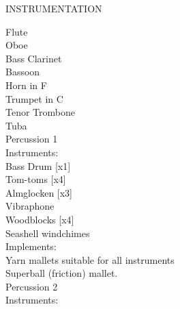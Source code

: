 \documentclass[11pt]{article}
\begin{document}
\endgroup

\vspace*{8\baselineskip}

\begin{center}
\huge INSTRUMENTATION
\end{center}

\hspace*{1cm} Flute
\\
\hspace*{1cm} Oboe
\\
\hspace*{1cm} Bass Clarinet
\\
\hspace*{1cm} Bassoon
\\
\hspace*{1cm} Horn in F
\\
\hspace*{1cm} Trumpet in C
\\
\hspace*{1cm} Tenor Trombone
\\
\hspace*{1cm} Tuba
\\
\hspace*{1cm} Percussion 1
\\
\hspace*{2cm} Instruments:
\\
\hspace*{3cm} Bass Drum [x1]
\\
\hspace*{3cm} Tom-toms [x4]
\\
\hspace*{3cm} Almglocken [x3]
\\
\hspace*{3cm} Vibraphone
\\
\hspace*{3cm} Woodblocks [x4]
\\
\hspace*{3cm} Seashell windchimes
\\
\hspace*{2cm} Implements:
\\
\hspace*{3cm} Yarn mallets suitable for all instruments
\\
\hspace*{3cm} Superball (friction) mallet.
\\
\hspace*{1cm} Percussion 2
\\
\hspace*{2cm} Instruments:
\end{document}
